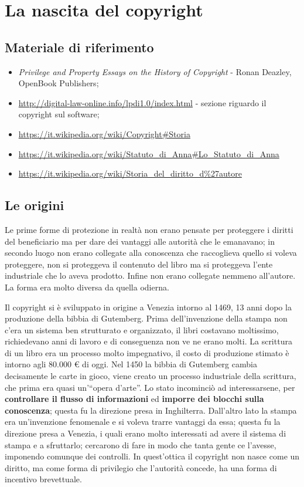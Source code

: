 \chapter{La nascita del copyright}

\section*{Materiale di riferimento}

\begin{itemize}

\item \textit{Privilege and Property Essays on the History of Copyright} - Ronan Deazley, OpenBook Publishers;
\item \url{http://digital-law-online.info/lpdi1.0/index.html} - sezione riguardo il copyright sul software;
\item \url{https://it.wikipedia.org/wiki/Copyright#Storia}
\item \url{https://it.wikipedia.org/wiki/Statuto_di_Anna#Lo_Statuto_di_Anna}
\item \url{https://it.wikipedia.org/wiki/Storia_del_diritto_d\%27autore}
\end{itemize}

\section{Le origini}

Le prime forme di protezione in realtà non erano pensate per proteggere i diritti del beneficiario ma per dare dei vantaggi alle autorità che le emanavano; in secondo luogo non erano collegate alla conoscenza che raccoglieva quello si voleva proteggere, non si proteggeva il contenuto del libro ma si proteggeva l'ente industriale che lo aveva prodotto. Infine non erano collegate nemmeno all'autore. La forma era molto diversa da quella odierna.

Il copyright si è sviluppato in origine a Venezia intorno al 1469, 13 anni dopo la produzione della bibbia di Gutemberg. Prima dell'invenzione della stampa non c'era un sistema ben strutturato e organizzato, il libri costavano moltissimo, richiedevano anni di lavoro e di conseguenza non ve ne erano molti. 
La scrittura di un libro era un processo molto impegnativo, il costo di produzione stimato è intorno agli 80.000 \euro{} di oggi. 
Nel 1450 la bibbia di Gutemberg cambia decisamente le carte in gioco, viene creato un processo industriale della scrittura, che prima era quasi un'``opera d'arte''. 
Lo stato incominciò ad interessarsene, per \textbf{controllare il flusso di informazioni} ed \textbf{imporre dei blocchi sulla conoscenza}; questa fu la direzione presa in Inghilterra. 
Dall'altro lato la stampa era un'invenzione fenomenale e si voleva trarre vantaggi da essa; questa fu la direzione presa a Venezia, i quali erano molto interessati ad avere il sistema di stampa e a sfruttarlo; cercarono di fare in modo che tanta gente ce l'avesse, imponendo comunque dei controlli. 
In quest'ottica il copyright non nasce come un diritto, ma come forma di privilegio che l'autorità concede, ha una forma di incentivo brevettuale.

